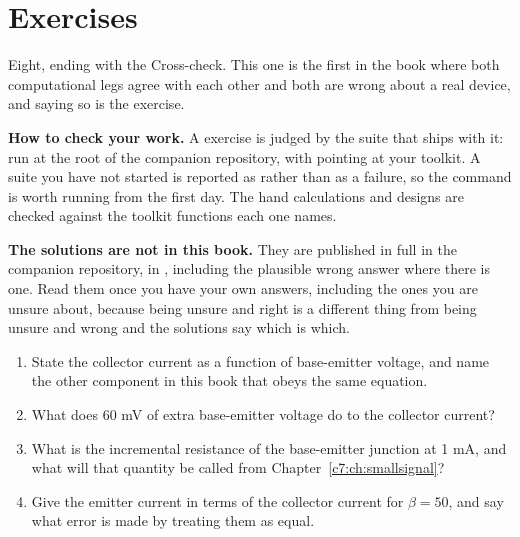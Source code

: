 
\section{Exercises}
\label{c5:sec:exercises}

Eight, ending with the Cross-check. This one is the first in the book where both computational legs agree with each other and both are wrong about a real device, and saying so is the exercise.

\begin{aside}
\textbf{How to check your work.} A  exercise is judged by the suite that ships with it: run  at the root of the companion repository, with  pointing at your toolkit. A suite you have not started is reported as  rather than as a failure, so the command is worth running from the first day. The hand calculations and designs are checked against the toolkit functions each one names.

\textbf{The solutions are not in this book.} They are published in full in the companion repository, in , including the plausible wrong answer where there is one. Read them once you have your own answers, including the ones you are unsure about, because being unsure and right is a different thing from being unsure and wrong and the solutions say which is which.
\end{aside}

\label{c5:ex:1}
\begin{enumerate}
  \item State the collector current as a function of base-emitter voltage, and name the other component in this book that obeys the same equation.
  \item What does 60 mV of extra base-emitter voltage do to the collector current?
  \item What is the incremental resistance of the base-emitter junction at 1 mA, and what will that quantity be called from Chapter~\ref{c7:ch:smallsignal}?
  \item Give the emitter current in terms of the collector current for $\beta = 50$, and say what error is made by treating them as equal.
\end{enumerate}

